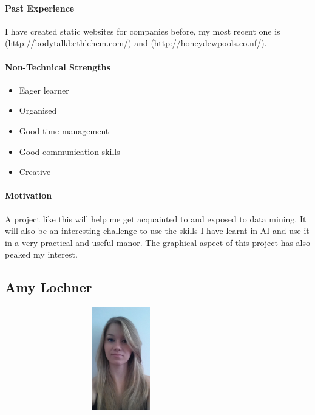 \documentclass[english]{article}
\begin{document}
			\paragraph{Past Experience}
            I have created static websites for companies before, my most recent one is (\href{http://bodytalkbethlehem.com/}{http://bodytalkbethlehem.com/}) and (\sloppy\href{http://honeydewpools.co.nf/}{http://honeydewpools.co.nf/}).
			
			\paragraph{Non-Technical Strengths}
			\begin{itemize}
				\setlength\itemsep{0.2em}
		       	\item Eager learner
		       	\item Organised 
		       	\item Good time management
		       	\item Good communication skills
		       	\item Creative
			\end{itemize}
			
			\paragraph{Motivation}
			A project like this will help me get acquainted to and exposed to data mining. It will also be an interesting challenge to use the skills I have learnt in AI and use it in a very practical and useful manor. The graphical aspect of this project has also peaked my interest.
		
		\newpage
		\subsection{Amy Lochner}
		    \begin{figure}
				\begin{center}
					\includegraphics[width=8cm, height=4.5cm, angle=90]{amy.jpg}
				\end{center}
			\end{figure}
\end{document}
